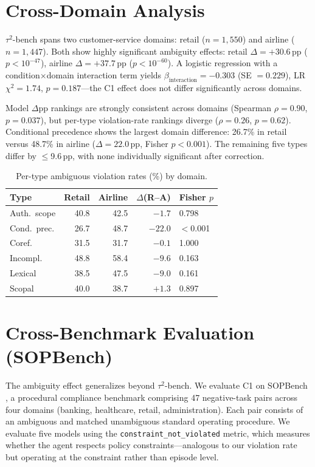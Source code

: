 \section{Cross-Domain Analysis}
\label{app:cross_domain}

$\tau^2$-bench spans two customer-service domains: retail ($n = 1{,}550$) and airline ($n = 1{,}447$). Both show highly significant ambiguity effects: retail $\Delta = +30.6$\,pp ($p < 10^{-47}$), airline $\Delta = +37.7$\,pp ($p < 10^{-60}$). A logistic regression with a condition$\times$domain interaction term yields $\beta_{\text{interaction}} = -0.303$ (SE $= 0.229$), LR $\chi^2 = 1.74$, $p = 0.187$---the C1 effect does not differ significantly across domains.

Model $\Delta$pp rankings are strongly consistent across domains (Spearman $\rho = 0.90$, $p = 0.037$), but per-type violation-rate rankings diverge ($\rho = 0.26$, $p = 0.62$). Conditional precedence shows the largest domain difference: 26.7\% in retail versus 48.7\% in airline ($\Delta = 22.0$\,pp, Fisher $p < 0.001$). The remaining five types differ by $\leq$9.6\,pp, with none individually significant after correction.

\begin{table}[!ht]
\centering
\small
\caption{Per-type ambiguous violation rates (\%) by domain.}
\label{tab:cross_domain}
\setlength{\tabcolsep}{4pt}
\begin{tabular}{lrrrl}
\toprule
Type & Retail & Airline & $\Delta$(R--A) & Fisher $p$ \\
\midrule
Auth.\ scope & 40.8 & 42.5 & $-1.7$ & 0.798 \\
Cond.\ prec. & 26.7 & 48.7 & $-22.0$ & $<$0.001 \\
Coref. & 31.5 & 31.7 & $-0.1$ & 1.000 \\
Incompl. & 48.8 & 58.4 & $-9.6$ & 0.163 \\
Lexical & 38.5 & 47.5 & $-9.0$ & 0.161 \\
Scopal & 40.0 & 38.7 & $+1.3$ & 0.897 \\
\bottomrule
\end{tabular}
\end{table}

\section{Cross-Benchmark Evaluation (SOPBench)}
\label{app:sopbench}

The ambiguity effect generalizes beyond $\tau^2$-bench. We evaluate C1 on SOPBench \citep{li_sopbench_2025}, a procedural compliance benchmark comprising 47 negative-task pairs across four domains (banking, healthcare, retail, administration). Each pair consists of an ambiguous and matched unambiguous standard operating procedure. We evaluate five models using the \texttt{constraint\_not\_violated} metric, which measures whether the agent respects policy constraints---analogous to our violation rate but operating at the constraint rather than episode level.

